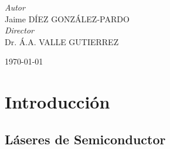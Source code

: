 \documentclass[a4paper, 11pt, oneside]{book}
\begin{document}
\begin{titlepage}
			
				\begin{flushright}
					\large
					\textit{Autor}\\
					Jaime \textsc{DÍEZ GONZÁLEZ-PARDO} \\ %
					\large
					\textit{Director}\\
					Dr. Á.A. \textsc{VALLE GUTIERREZ} %
				\end{flushright}
			
			
				\vfill\vfill\vfill %
				
				{\large\today} %
				
			
				\vfill %
		
		\end{titlepage}


		\tableofcontents

		\listoffigures


			\chapter{Introducción} %
				\label{sec:Intro}


				\section{Láseres de Semiconductor}
					
\end{document}
